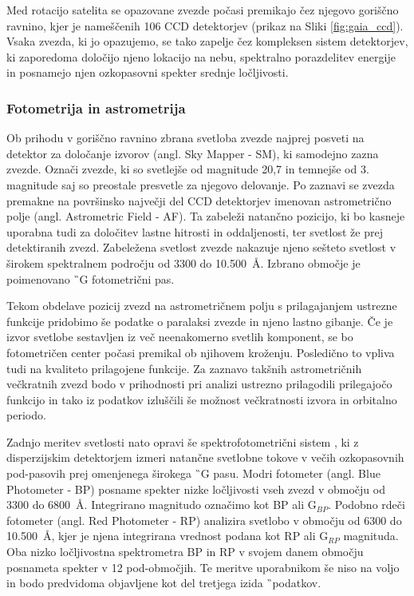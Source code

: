 Med rotacijo satelita se opazovane zvezde počasi premikajo čez njegovo goriščno ravnino, kjer je nameščenih 106 CCD detektorjev (prikaz na Sliki \ref{fig:gaia_ccd}). Vsaka zvezda, ki jo opazujemo, se tako zapelje čez kompleksen sistem detektorjev, ki zaporedoma določijo njeno lokacijo na nebu, spektralno porazdelitev energije in posnamejo njen ozkopasovni spekter srednje ločljivosti.

\subsubsection{Fotometrija in astrometrija}
Ob prihodu v goriščno ravnino zbrana svetloba zvezde najprej posveti na detektor za določanje izvorov (angl. Sky Mapper - SM), ki samodejno zazna zvezde. Označi zvezde, ki so svetlejše od magnitude 20,7 in temnejše od 3. magnitude saj so preostale presvetle za njegovo delovanje. Po zaznavi se zvezda premakne na površinsko največji del CCD detektorjev imenovan astrometrično polje (angl. Astrometric Field - AF). Ta zabeleži natančno pozicijo, ki bo kasneje uporabna tudi za določitev lastne hitrosti in oddaljenosti, ter svetlost že prej detektiranih zvezd. Zabeležena svetlost zvezde nakazuje njeno sešteto svetlost v širokem spektralnem področju od 3300 do 10.500~\AA. Izbrano območje je poimenovano \G\ G fotometrični pas.

Tekom obdelave pozicij zvezd na astrometričnem polju s prilagajanjem ustrezne funkcije pridobimo še podatke o paralaksi zvezde in njeno lastno gibanje. Če je izvor svetlobe sestavljen iz več neenakomerno svetlih komponent, se bo fotometričen center počasi premikal ob njihovem kroženju. Posledično to vpliva tudi na kvaliteto prilagojene funkcije. Za zaznavo takšnih astrometričnih večkratnih zvezd bodo v prihodnosti pri analizi ustrezno prilagodili prilegajočo funkcijo in tako iz podatkov izluščili še možnost večkratnosti izvora in orbitalno periodo.

Zadnjo meritev svetlosti nato opravi še spektrofotometrični sistem \cite{2018arXiv180409368E}, ki z disperzijskim detektorjem izmeri natančne svetlobne tokove v večih ozkopasovnih pod-pasovih prej omenjenega širokega \G\ G pasu. Modri fotometer (angl. Blue Photometer - BP) posname spekter nizke ločljivosti vseh zvezd v območju od 3300 do 6800~\AA. Integrirano magnitudo označimo kot BP ali G$_{BP}$. Podobno rdeči fotometer (angl. Red Photometer - RP) analizira svetlobo v območju od 6300 do 10.500~\AA, kjer je njena integrirana vrednost podana kot RP ali G$_{RP}$ magnituda. Oba nizko ločljivostna spektrometra BP in RP v svojem danem območju posnameta spekter v 12 pod-območjih. Te meritve uporabnikom še niso na voljo in bodo predvidoma objavljene kot del tretjega izida \G\ podatkov.

